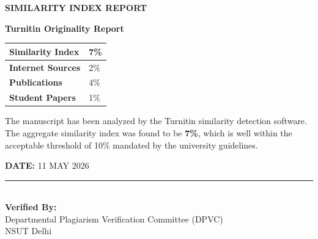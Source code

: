 \begin{center}
    \large
    \textbf{SIMILARITY INDEX REPORT}
\end{center}

\vspace{1cm}

\textbf{Turnitin Originality Report}

\vspace{1cm}

\begin{table}[h]
    \centering
    \begin{tabular}{ll}
        \midrule
        \textbf{Similarity Index} & 7\% \\
        \midrule
        \textbf{Internet Sources} & 2\% \\
        \textbf{Publications} & 4\% \\
        \textbf{Student Papers} & 1\% \\
        \midrule
    \end{tabular}
\end{table}

\vspace{1cm}

The manuscript has been analyzed by the Turnitin similarity detection software. The aggregate similarity index was found to be \textbf{7\%}, which is well within the acceptable threshold of 10\% mandated by the university guidelines.

\vspace{2cm}

\begin{flushleft}
    \textbf{DATE:} 11 MAY 2026
\end{flushleft}

\vspace{1cm}

\begin{flushright}
    \rule{5cm}{0.4pt}\\
    \textbf{Verified By:}\\
    Departmental Plagiarism Verification Committee (DPVC)\\
    NSUT Delhi
\end{flushright}
